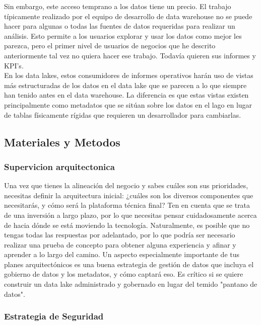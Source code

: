 \documentclass[preprint,12pt]{elsarticle}
\begin{document}
Sin embargo, este acceso temprano a los datos tiene un precio. El trabajo típicamente realizado por el equipo de desarrollo de data warehouse no se puede hacer para algunas o todas las fuentes de datos requeridas para realizar un análisis. Esto permite a los usuarios explorar y usar los datos como mejor les parezca, pero el primer nivel de usuarios de negocios que he descrito anteriormente tal vez no quiera hacer ese trabajo. Todavía quieren sus informes y KPI's.\\

En los data lakes, estos consumidores de informes operativos harán uso de vistas más estructuradas de los datos en el data lake que se parecen a lo que siempre han tenido antes en el data warehouse. La diferencia es que estas vistas existen principalmente como metadatos que se sitúan sobre los datos en el lago en lugar de tablas físicamente rígidas que requieren un desarrollador para cambiarlas.\\



\subsection{Materiales y Metodos}

\subsubsection{Supervicion arquitectonica}
	
Una vez que tienes la alineación del negocio y sabes cuáles son sus prioridades, necesitas definir la arquitectura inicial: ¿cuáles son los diversos componentes que necesitarás, y cómo será la plataforma técnica final? Ten en cuenta que se trata de una inversión a largo plazo, por lo que necesitas pensar cuidadosamente acerca de hacia dónde se está moviendo la tecnología. Naturalmente, es posible que no tengas todas las respuestas por adelantado, por lo que podría ser necesario realizar una prueba de concepto para obtener alguna experiencia y afinar y aprender a lo largo del camino. Un aspecto especialmente importante de tus planes arquitectónicos es una buena estrategia de gestión de datos que incluya el gobierno de datos y los metadatos, y cómo captará eso. Es crítico si se quiere construir un data lake administrado y gobernado en lugar del temido "pantano de datos". \\

\subsubsection{Estrategia de Seguridad}
\end{document}

